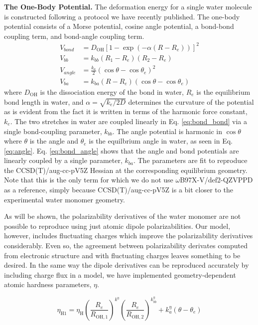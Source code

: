 \documentclass[journal=jctcce,manuscript=article]{achemso}
\begin{document}
\textbf{The One-Body Potential.} The deformation energy for a single water molecule is constructed following a protocol we have recently published.\cite{Sami2024} The one-body potential consists of a Morse potential, cosine angle potential, a bond-bond coupling term, and bond-angle coupling term. 
\begin{align}
  \label{eq:morse}
  V_{bond}&=D_{\mathrm{OH}}\left[ 1-\exp(-\alpha (R-R_e))\right]^2 \\
  \label{eq:bond_bond}
  V_{bb}&=k_{bb}(R_1-R_e)(R_2-R_e) \\
  \label{eq:angle}
  V_{angle}&=\frac{k_a}{2}(\cos\theta-\cos\theta_e)^2 \\
  \label{eq:bond_angle}
  V_{ba}&=k_{ba}(R-R_e)(\cos\theta-\cos\theta_e)
\end{align}
where $D_{\mathrm{OH}}$ is the dissociation energy of
the  bond in water, $R_e$ is the equilibrium bond length in water,
and $\alpha=\sqrt{k_e/2D}$ determines the curvature of the potential as is
evident from the fact it is written in terms of the harmonic force constant, $k_e$. The two  stretches in water are coupled linearly in Eq. \ref{eq:bond_bond}
via a single bond-coupling parameter, $k_{bb}$. The angle potential is harmonic in $\cos\theta$ where $\theta$ is the  angle
and $\theta_e$ is the equilbrium angle in water, as seen in Eq. \ref{eq:angle}.
Eq. \ref{eq:bond_angle} shows that the angle and bond potentials are linearly
coupled by a single parameter, $k_{ba}$. The parameters are fit to reproduce the CCSD(T)/aug-cc-pV5Z Hessian at the
corresponding equilibrium geometry. Note that this is the only term for which we do not
use $\omega$B97X-V/def2-QZVPPD as a reference, simply because CCSD(T)/aug-cc-pV5Z is a
bit closer to the experimental water monomer geometry.

As will be shown, the polarizability derivatives of the water monomer are not possible to reproduce using just atomic dipole polarizabilities. Our model, however, includes fluctuating charges which improve the polarizability derivatives considerably. Even so, the agreement between polarizability derivates computed from electronic structure and with fluctuating charges leaves something to be desired. In the same way the dipole derivatives can be reproduced accurately by including charge flux in a model\cite{liu2019implementation}, we have implemented geometry-dependent atomic hardness parameters, $\eta$.

\begin{equation}
  \eta_{\mathrm{H1}} = \eta_\mathrm{H} \left(\frac{R_e}{R_{\mathrm{OH,1}}}\right)^{k^\eta}\left(\frac{R_e}{R_{\mathrm{OH,2}}}\right)^{k^\eta_{bb}} + k^\eta_{a}(\theta - \theta_e)
  \label{eq:variable_hardness}
\end{equation}
\end{document}
